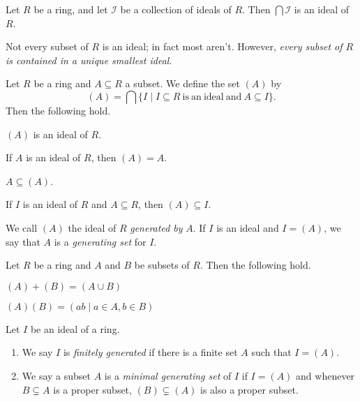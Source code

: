\begin{prop}
Let \(R\) be a ring, and let \(\mathcal{I}\) be a collection of ideals of \(R\).
Then \(\bigcap \mathcal{I}\) is an ideal of \(R\).
\end{prop}

Not every subset of \(R\) is an ideal; in fact most aren't.
However, \emph{every subset of \(R\) is contained in a unique smallest ideal}.

\begin{prop}
Let \(R\) be a ring and \(A \subseteq R\) a subset.
We define the set \((A)\) by \[ (A) = \bigcap \{ I \mid I \subseteq R\ \mathrm{is\ an\ ideal\ and}\ A \subseteq I \}. \]
Then the following hold.
\begin{proplist}
\item \((A)\) is an ideal of \(R\).
\item If \(A\) is an ideal of \(R\), then \((A) = A\).
\item \(A \subseteq (A)\).
\item If \(I\) is an ideal of \(R\) and \(A \subseteq R\), then \((A) \subseteq I\).
\end{proplist}
We call \((A)\) the ideal of \(R\) \emph{generated by} \(A\).
If \(I\) is an ideal and \(I = (A)\), we say that \(A\) is a \emph{generating set} for \(I\).
\end{prop}

\begin{prop}
Let \(R\) be a ring and \(A\) and \(B\) be subsets of \(R\).
Then the following hold.
\begin{proplist}
\item \((A) + (B) = (A \cup B)\)
\item \((A)(B) = (ab \mid a \in A, b \in B)\)
\end{proplist}
\end{prop}

\begin{dfn}
Let \(I\) be an ideal of a ring.
\begin{enumerate}
\item We say \(I\) is \emph{finitely generated} if there is a finite set \(A\) such that \(I = (A)\).
\item We say a subset \(A\) is a \emph{minimal generating set} of \(I\) if \(I = (A)\) and whenever \(B \subsetneq A\) is a proper subset, \((B) \subsetneq (A)\) is also a proper subset.
\end{enumerate}
\end{dfn}

